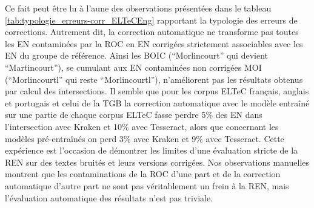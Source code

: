 Ce fait peut être lu à l'aune des observations présentées dans le tableau \ref{tab:typologie_erreurs-corr_ELTeCEng} rapportant la typologie des erreurs de corrections. Autrement dit, la correction automatique ne transforme pas toutes les EN contaminées par la ROC en EN corrigées strictement associables avec les EN du groupe de référence. Ainsi les BOIC (``Morlincourt'' qui devient ``Martincourt''), se cumulant aux EN contaminées non corrigées MOI (``Morlincourtl'' qui reste ``Morlincourtl''), n'améliorent pas les résultats obtenus par calcul des intersections. Il semble que pour les corpus ELTeC français, anglais et portugais et celui de la TGB la correction automatique avec le modèle entraîné sur une partie de chaque corpus ELTeC fasse perdre 5\% des EN dans l'intersection avec Kraken et 10\% avec Tesseract, alors que concernant les modèles pré-entraînés on perd 3\% avec Kraken et 9\% avec Tesseract. Cette expérience est l'occasion de démontrer les limites d'une évaluation stricte de la REN sur des textes bruités et leurs versions corrigées. Nos observations manuelles montrent que les contaminations de la ROC d'une part et de la correction automatique d'autre part ne sont pas véritablement un frein à la REN, mais l'évaluation automatique des résultats n'est pas triviale.



